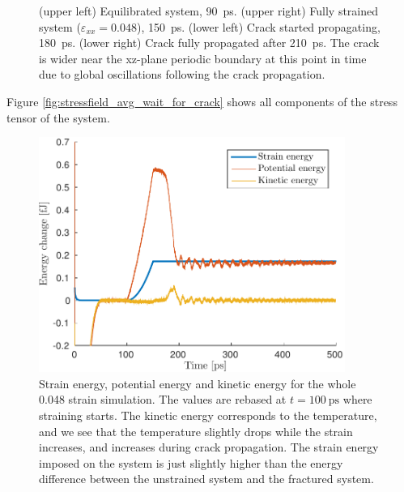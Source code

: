 \begin{figure}
\begin{minipage}[b]{0.5\linewidth}
\end{minipage}
\caption{(upper left) Equilibrated system, \SI{90}{\pico\second}. (upper right) Fully strained system ($\varepsilon_{xx} = 0.048$), \SI{150}{\pico\second}. (lower left) Crack started propagating, \SI{180}{\pico\second}. (lower right) Crack fully propagated after \SI{210}{\pico\second}. The crack is wider near the xz-plane periodic boundary at this point in time due to global oscillations following the crack propagation.}
\end{figure}

Figure \ref{fig:stressfield_avg_wait_for_crack} shows all components of the stress tensor of the system. 

\begin{figure}
\centering
\includegraphics[width=10cm]{../figures/thesis/strain_pot_kin_eng_1048_24_24_12.pdf}
\caption{Strain energy, potential energy and kinetic energy for the whole 0.048 strain simulation. The values are rebased at $t=\SI{100}{\pico\second}$ where straining starts. The kinetic energy corresponds to the temperature, and we see that the temperature slightly drops while the strain increases, and increases during crack propagation. The strain energy imposed on the system is just slightly higher than the energy difference between the unstrained system and the fractured system.}
\end{figure}



